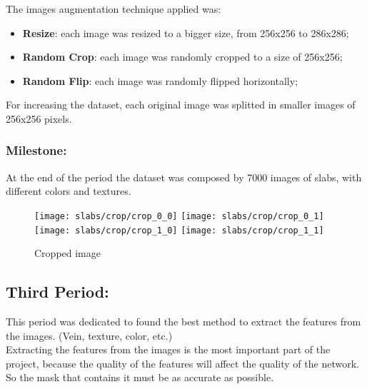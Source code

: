 The images augmentation technique applied was:
\begin{itemize}
    \item  \textbf{Resize}: each image was resized to a bigger size, from 256x256 to 286x286;
    \item  \textbf{Random Crop}: each image was randomly cropped to a size of 256x256;
    \item  \textbf{Random Flip}: each image was randomly flipped horizontally;
\end{itemize}

For increasing the dataset, each original image was splitted in smaller images of 256x256 pixels.\\

\subsubsection{Milestone:}

At the end of the period the dataset was composed by 7000 images of slabs, with different colors and textures.


\begin{figure}
    \centering
    \texttt{[image: slabs/crop/crop\_0\_0]}
    \texttt{[image: slabs/crop/crop\_0\_1]}
    \\
    \texttt{[image: slabs/crop/crop\_1\_0]}
    \texttt{[image: slabs/crop/crop\_1\_1]}
    \caption{Cropped image}\label{fig:foobar}
\end{figure}

\subsection{Third Period:}
This period was dedicated to found the best method to extract the features from the images. (Vein, texture, color, etc.)\\
Extracting the features from the images is the most important part of the project, because the quality of the features will affect the quality of the network.\\
So the mask that contains it must be as accurate as possible.\\


